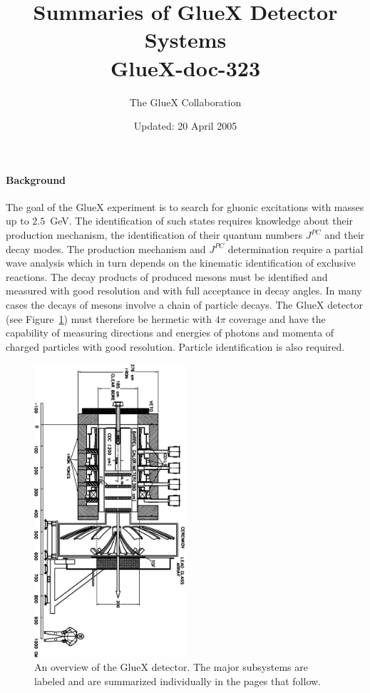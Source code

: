 
%
%
\title{Summaries of GlueX Detector Systems \\
\small{GlueX-doc-323} \\
}
%
\date{Updated: 20 April 2005}
%
\author{The GlueX Collaboration}
%

\maketitle
%
%
\paragraph{Background}
The goal of the GlueX experiment is to search for gluonic excitations
with masses up to $2.5$~GeV.  The identification of such states
requires knowledge about their production mechanism, the
identification of their quantum numbers $J^{PC}$ and their decay
modes. The production mechanism and $J^{PC}$ determination require a
partial wave analysis which in turn depends on the kinematic
identification of exclusive reactions. The decay products of produced
mesons must be identified and measured with good resolution and with
full acceptance in decay angles.  In many cases the decays of mesons
involve a chain of particle decays.  The GlueX detector (see
Figure~\ref{fig:ch6-hd_schematic}) must therefore be hermetic with 
$4\pi$ coverage and have the capability of measuring directions and
energies of photons and momenta of charged particles with good 
resolution.  Particle identification is also required.


\begin{figure}[t]
\centering
\includegraphics[width=0.50\textwidth,angle=90]{ch6_gluex_detector.eps}
\caption[An overview of the GlueX detector.]{\label{fig:ch6-hd_schematic}
An overview of the GlueX detector. The major subsystems are labeled and 
are summarized individually in the pages that follow. }
\end{figure}


